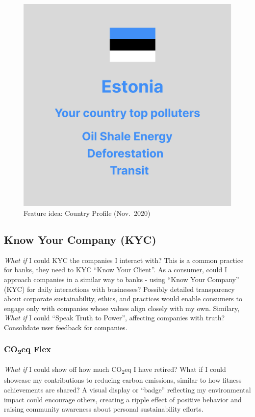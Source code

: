 \documentclass[
  12pt,
  letterpaper,
  DIV=11,
  numbers=noendperiod]{scrartcl}
\begin{document}
\begin{figure}[H]

{\centering \includegraphics[width=0.5\linewidth,height=\textheight,keepaspectratio]{./images/prototypes/country-profile.png}

}

\caption{Feature idea: Country Profile (Nov.~2020)}

\end{figure}%

\subsection{Know Your Company (KYC)}\label{know-your-company-kyc}

\emph{What if} I could KYC the companies I interact with? This is a
common practice for banks, they need to KYC ``Know Your Client''. As a
consumer, could I approach companies in a similar way to banks - using
``Know Your Company'' (KYC) for daily interactions with businesses?
Possibly detailed transparency about corporate sustainability, ethics,
and practices would enable consumers to engage only with companies whose
values align closely with my own. Similary, \emph{What if} I could
``Speak Truth to Power'', affecting companies with truth? Consolidate
user feedback for companies.

\subsubsection{\texorpdfstring{CO\textsubscript{2}eq
Flex}{CO2eq Flex}}\label{co2eq-flex}

\emph{What if} I could show off how much CO\textsubscript{2}eq I have
retired? What if I could showcase my contributions to reducing carbon
emissions, similar to how fitness achievements are shared? A visual
display or ``badge'' reflecting my environmental impact could encourage
others, creating a ripple effect of positive behavior and raising
community awareness about personal sustainability efforts.
\end{document}
